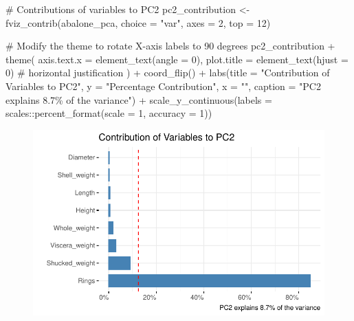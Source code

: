 \documentclass[
  letterpaper,
  DIV=11,
  numbers=noendperiod]{scrreprt}
\newenvironment{Shaded}{\begin{snugshade}}{\end{snugshade}}
\newcommand{\AttributeTok}[1]{\textcolor[rgb]{0.40,0.45,0.13}{#1}}
\newcommand{\CommentTok}[1]{\textcolor[rgb]{0.37,0.37,0.37}{#1}}
\newcommand{\DecValTok}[1]{\textcolor[rgb]{0.68,0.00,0.00}{#1}}
\newcommand{\FunctionTok}[1]{\textcolor[rgb]{0.28,0.35,0.67}{#1}}
\newcommand{\NormalTok}[1]{\textcolor[rgb]{0.00,0.23,0.31}{#1}}
\newcommand{\OtherTok}[1]{\textcolor[rgb]{0.00,0.23,0.31}{#1}}
\newcommand{\SpecialCharTok}[1]{\textcolor[rgb]{0.37,0.37,0.37}{#1}}
\newcommand{\StringTok}[1]{\textcolor[rgb]{0.13,0.47,0.30}{#1}}
\begin{document}
\begin{Shaded}
\begin{Highlighting}[]
\CommentTok{\# Contributions of variables to PC2}
\NormalTok{pc2\_contribution }\OtherTok{\textless{}{-}} \FunctionTok{fviz\_contrib}\NormalTok{(abalone\_pca, }\AttributeTok{choice =} \StringTok{"var"}\NormalTok{, }\AttributeTok{axes =} \DecValTok{2}\NormalTok{, }\AttributeTok{top =} \DecValTok{12}\NormalTok{)}

\CommentTok{\# Modify the theme to rotate X{-}axis labels to 90 degrees}
\NormalTok{pc2\_contribution }\SpecialCharTok{+}
  \FunctionTok{theme}\NormalTok{(}
    \AttributeTok{axis.text.x =} \FunctionTok{element\_text}\NormalTok{(}\AttributeTok{angle =} \DecValTok{0}\NormalTok{),}
    \AttributeTok{plot.title =} \FunctionTok{element\_text}\NormalTok{(}\AttributeTok{hjust =} \DecValTok{0}\NormalTok{)  }\CommentTok{\# horizontal justification}
\NormalTok{  ) }\SpecialCharTok{+}
  \FunctionTok{coord\_flip}\NormalTok{() }\SpecialCharTok{+}
  \FunctionTok{labs}\NormalTok{(}\AttributeTok{title =} \StringTok{"Contribution of Variables to PC2"}\NormalTok{,}
       \AttributeTok{y =} \StringTok{"Percentage Contribution"}\NormalTok{,}
       \AttributeTok{x =} \StringTok{""}\NormalTok{,}
       \AttributeTok{caption =} \StringTok{"PC2 explains 8.7\% of the variance"}\NormalTok{) }\SpecialCharTok{+}
  \FunctionTok{scale\_y\_continuous}\NormalTok{(}\AttributeTok{labels =}\NormalTok{ scales}\SpecialCharTok{::}\FunctionTok{percent\_format}\NormalTok{(}\AttributeTok{scale =} \DecValTok{1}\NormalTok{,}
                                                     \AttributeTok{accuracy =} \DecValTok{1}\NormalTok{))}
\end{Highlighting}
\end{Shaded}

\begin{figure}[H]

{\centering \includegraphics{examples_files/figure-pdf/unnamed-chunk-13-2.pdf}

}

\end{figure}
\end{document}

